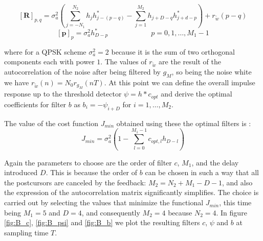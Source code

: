 \documentclass[a4paper,11.5pt]{article}
\begin{document}
\begin{equation} \label{eq:wienerR}
\mathbf{[R]}_{p,q} = \sigma_a^2 \left( \sum_{j=-N_1}^{N_2}h_jh^*_{j-(p-q)}-\sum_{j=1}^{M_2}h_{j+D-q}h^*_{j+d-p} \right) + r_{\tilde{w}}(p-q)
\end{equation}
\begin{equation} \label{eq:wienerp}
\mathbf{[p]}_p = \sigma_a^2 h^*_{D-p} \quad\quad\quad\quad\quad\quad p = 0,1,\dots,M_1-1
\end{equation}

where for a QPSK scheme $\sigma_a^2=2$ because it is the sum of two orthogonal components each with power $1$. The values of $r_{\tilde{w}}$ are the result of the autocorrelation of the noise after being filtered by $g_M$, so being the noise white we have $r_{\tilde{w}}(n)=N_0r_{g_M}(nT)$. At this point we can define the overall impulse response up to the threshold detector $\psi = h*c_{opt}$ and derive the optimal coefficients for filter $b$ as $b_i=-\psi_{i+D}$ for $i=1,\dots,M_2$.

The value of the cost function $J_{min}$ obtained using these the optimal filters is :
\begin{equation} \label{eq:jmin}
J_{min} = \sigma^2_a \left( 1-\sum_{l=0}^{M_1-1} c_{opt,l}h_{D-l}\right)
\end{equation}

Again the parameters to choose are the order of filter $c$, $M_1$, and the delay introduced $D$. This is because the order of $b$ can be chosen in such a way that all the postcursors are canceled by the feedback: $M_2=N_2+M_1-D-1$, and also the expression of the autocorrelation matrix significantly simplifies. The choice is carried out by selecting the values that minimize the functional $J_{min}$, this time being $M_1=5$ and $D=4$, and consequently $M_2=4$ because $N_2=4$. In figure \ref{fig:B_c}, \ref{fig:B_psi} and \ref{fig:B_b} we plot the resulting filters $c$, $\psi$ and $b$ at sampling time $T$. 
\end{document}
